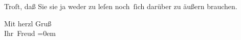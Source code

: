 \pstart
           Troſt, daß Sie sie ja weder zu leſen noch ſich darüber {\pb}zu äußern brauchen.\pend
           
\pstart
           Mit herzl Gruß{\\[\baselineskip]}\spacefill\mbox{Ihr Freud}\pend
           \leftskip=0em{}\endnumbering{}
\begin{anhang}
\end{anhang}\newcommand{\dateiname}{L03818}\newcommand{\titel}{Sigmund Freud an Arthur Schnitzler, 8. 3. 1926}\newcommand{\editorInnen}{Selma Jahnke und Martin Anton Müller}
